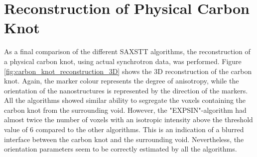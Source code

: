 \clearpage
\section{Reconstruction of Physical Carbon Knot}\label{sec:reconstruction_physical_carbon_knot}

As a final comparison of the different SAXSTT algorithms, the reconstruction of a physical carbon knot, using actual synchrotron data, was performed.
Figure \ref{fig:carbon_knot_reconstruction_3D} shows the 3D reconstruction of the carbon knot.
Again, the marker colour represents the degree of anisotropy, while the orientation of the nanostructures is represented by the direction of the markers.
All the algorithms showed similar ability to segregate the voxels containing the carbon knot from the surrounding void.
However, the "EXPSIN"-algorithm had almost twice the number of voxels with an isotropic intensity above the threshold value of 6 compared to the other algorithms.
This is an indication of a blurred interface between the carbon knot and the surrounding void.
Nevertheless, the orientation parameters seem to be correctly estimated by all the algorithms.

\clearpage

